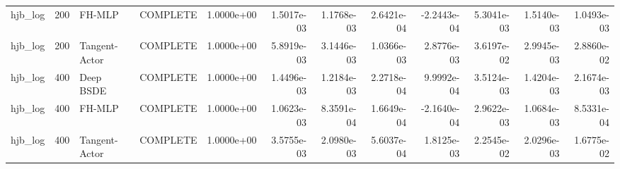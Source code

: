 \begin{tabular}{lrllrrrrrrrr}
hjb\_log & 200 & FH-MLP & COMPLETE & 1.0000e+00 & 1.5017e-03 & 1.1768e-03 & 2.6421e-04 & -2.2443e-04 & 5.3041e-03 & 1.5140e-03 & 1.0493e-03 \\
hjb\_log & 200 & Tangent-Actor & COMPLETE & 1.0000e+00 & 5.8919e-03 & 3.1446e-03 & 1.0366e-03 & 2.8776e-03 & 3.6197e-02 & 2.9945e-03 & 2.8860e-02 \\
hjb\_log & 400 & Deep BSDE & COMPLETE & 1.0000e+00 & 1.4496e-03 & 1.2184e-03 & 2.2718e-04 & 9.9992e-04 & 3.5124e-03 & 1.4204e-03 & 2.1674e-03 \\
hjb\_log & 400 & FH-MLP & COMPLETE & 1.0000e+00 & 1.0623e-03 & 8.3591e-04 & 1.6649e-04 & -2.1640e-04 & 2.9622e-03 & 1.0684e-03 & 8.5331e-04 \\
hjb\_log & 400 & Tangent-Actor & COMPLETE & 1.0000e+00 & 3.5755e-03 & 2.0980e-03 & 5.6037e-04 & 1.8125e-03 & 2.2545e-02 & 2.0296e-03 & 1.6775e-02 \\
\bottomrule
\end{tabular}

